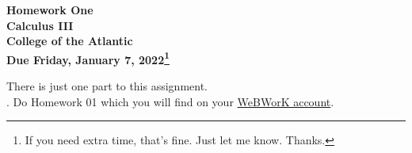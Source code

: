 \documentclass[12pt]{article}
\begin{document}
\pagestyle{empty}
 
\begin{center}
{\LARGE {\bf Homework One}}\\
\bigskip
{\Large {\bf Calculus III}}\\
\bigskip
{\Large {\bf College of the Atlantic}}\\
\bigskip
{ {\bf Due Friday, January 7, 2022\footnote{If you need extra time,
      that's fine. Just let me know. Thanks.}}}\\  
\end{center}
\medskip


\noindent There is just one part to this assignment.\\

.  Do Homework 01 which you will find
on your \href{https://webwork.runestone.academy/webwork2/coa-feldman-es3028m-winter-2022/}{WeBWorK account}.\\



%
%
\end{document}

